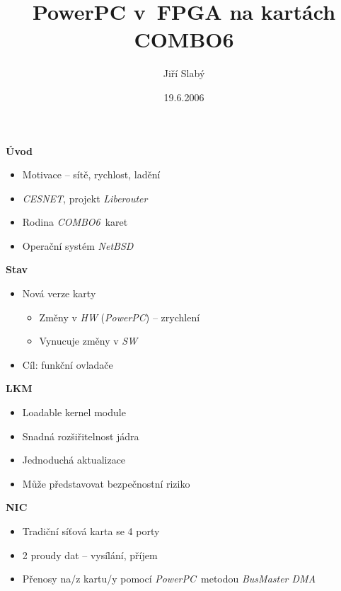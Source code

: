 \documentclass[a5paper,landscape]{slides}
\title{PowerPC v~FPGA na kartách COMBO6}
\author{Jiří Slabý}
\date{19.6.2006}
\newcommand{\com}{\emph{COMBO6}}
\newcommand{\nbsd}{\emph{NetBSD}}
\newcommand{\ppc}{\emph{PowerPC}}
\begin{document}
\maketitle

\begin{slide}
\begin{center}\textbf{Úvod}\end{center}
\begin{itemize}
\addtolength{\itemsep}{-1em}
\item Motivace -- sítě, rychlost, ladění
\item \emph{CESNET}, projekt \emph{Liberouter}
\item Rodina \com\ karet
\item Operační systém \nbsd
\end{itemize}
\end{slide}

\begin{slide}
\begin{center}\textbf{Stav}\end{center}
\begin{itemize}
\addtolength{\itemsep}{-0.7em}
\item Nová verze karty
  \begin{itemize}
\addtolength{\itemsep}{-0.7em}
    \item Změny v \emph{HW} (\ppc) -- zrychlení
    \item Vynucuje změny v \emph{SW}
  \end{itemize}
\item Cíl: funkční ovladače
\end{itemize}
\end{slide}

\begin{slide}
\begin{center}\textbf{LKM}\end{center}
\begin{itemize}
\addtolength{\itemsep}{-1em}
\item Loadable kernel module
\item Snadná rozšiřitelnost jádra
\item Jednoduchá aktualizace
\item Může představovat bezpečnostní riziko
\end{itemize}
\end{slide}

\begin{slide}
\begin{center}\textbf{NIC}\end{center}
\begin{itemize}
\addtolength{\itemsep}{-1em}
\item Tradiční síťová karta se 4 porty
\item 2 proudy dat -- vysílání, příjem
\item Přenosy na/z kartu/y pomocí \ppc\ metodou \emph{BusMaster DMA}
\end{itemize}
\end{slide}
\end{document}
